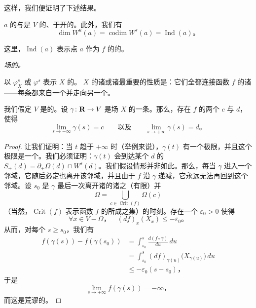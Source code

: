 这样，我们便证明了下述结果。

\begin{proposition}\label{thm:stable-unstable-submanifolds}
\trCriticalPoint{} $a$ 的\trStableManifold{}与\trUnstableManifold{}是 $V$ 的、\trDiffeomorphic{}于开\trDisk{}的\trSubmanifold。此外，我们有
\[
\dim W^u(a)=\operatorname{codim}W^s(a)=\operatorname{Ind}(a)\text{。}
\]\noqed
\end{proposition}

这里，$\operatorname{Ind}(a)$ 表示点 $a$ 作为 $f$ 的\trCriticalPoint{}的\trIndex。

\emph{\trPseudogradient{}场的\trTrajectory。}

以 $\varphi^s_X$ 或 $\varphi^s$ 表示\trPseudogradient{} $X$ 的\trFlow。\trVectorField{} $X$ 的诸\trFlowLine{}或诸\trTrajectory{}最重要的性质是：它们全都连接函数 $f$ 的诸\trCriticalPoint——每条\trTrajectory{}都来自一个\trCriticalPoint{}并走向另一个\trCriticalPoint。

\begin{proposition}\label{thm:trajectories-connect-criticals}
我们假定\trManifold{} $V$ 是\trCompact{}的。设 $\gamma\colon\mathbf{R}\to V$ 是\trPseudogradient{}场 $X$ 的一条\trTrajectory。那么，存在 $f$ 的两个\trCriticalPoint{} $c$ 与 $d$，使得
\[
\lim_{s\to-\infty}\gamma(s)=c \qquad\text{以及}\qquad \lim_{s\to+\infty}\gamma(s)=d\text{。}
\]
\end{proposition}

\begin{proof}
让我们证明：当 $t$ 趋于 $+\infty$ 时（举例来说），$\gamma(t)$ 有一个极限，并且这个极限是一个\trCriticalPoint。我们必须证明：$\gamma(t)$ 会到达某个\trCriticalPoint{} $d$ 的 $S_+(d)=\partial_+\Omega(d)\cap W^s(d)$。我们假设情形并非如此。那么，每当\trTrajectory{} $\gamma$ 进入一个\trMorse{}邻域，它随后必定也离开该邻域，并且由于 $f$ 沿 $\gamma$ 递减，它永远无法再回到这个邻域。设 $s_0$ 是 $\gamma$ 最后一次离开诸\trCriticalPoint{}的诸\trMorseChart{}之（有限）并
\[
\Omega=\bigcup_{c\in\operatorname{Crit}(f)}\Omega(c)
\]
（当然，$\operatorname{Crit}(f)$ 表示函数 $f$ 的\trCriticalPoint{}所成之集）的时刻。存在一个 $\varepsilon_0>0$ 使得
\[
\forall x\in V-\Omega\text{，}\quad (df)_x(X_x)\le-\varepsilon_0\text{。}
\]
从而，对每个 $s\ge s_0$，我们有
\[
\begin{aligned}
f(\gamma(s))-f(\gamma(s_0))
&=\int_{s_0}^{s}\frac{d(f\circ\gamma)}{du}\,du\\
&=\int_{s_0}^{s}(df)_{\gamma(u)}\bigl(X_{\gamma(u)}\bigr)\,du\\
&\le -\varepsilon_0(s-s_0)\text{，}
\end{aligned}
\]
于是
\[
\lim_{s\to+\infty}f(\gamma(s))=-\infty\text{，}
\]
而这是荒谬的。
\end{proof}

